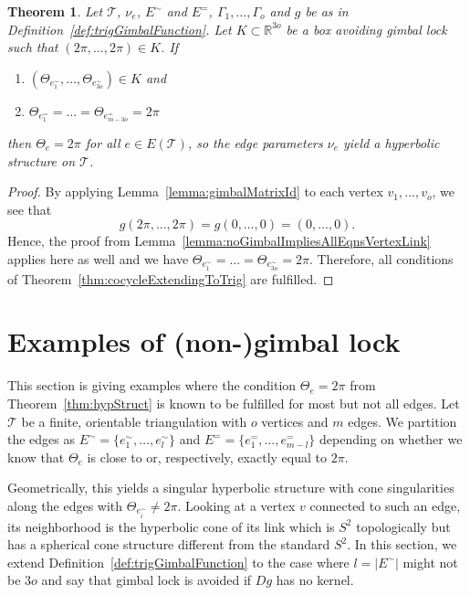 \documentclass[utopia,fullpage]{nmd/article}
\newcommand{\negSpace}{\!}
\newcommand\R{\mathbb R}
\newtheorem{theorem}{Theorem}[section]
\newcommand{\negSpace}{}
\newcommand\trig{\mathcal{T}}
\newcommand\myPath{\Gamma}
\begin{document}
\begin{theorem} \label{thm:mainThm}
Let $\trig\negSpace{}$, $\nu_e$, $E^\sim$ and $E^=$, $\myPath_1, \dots, \myPath_o$ and $g$ be as in Definition~\ref{def:trigGimbalFunction}. Let $K\subset \R^{3o}$ be a box avoiding gimbal lock such that $(2\pi, \dots, 2\pi)\in K$. If
\begin{enumerate}
\item $(\Theta_{e^\sim_1},\dots,\Theta_{e^\sim_{3o}})\in K$ and
\item $\Theta_{e^=_1}=\dots=\Theta_{e^=_{m-3o}}=2\pi$
\end{enumerate}
then $\Theta_e=2\pi$ for all $e\in E(\trig)$, so the edge parameters $\nu_e$ yield a hyperbolic structure on $\trig$\negSpace{}.
\end{theorem}

\begin{proof}
By applying Lemma~\ref{lemma:gimbalMatrixId} to each vertex $v_1,\dots, v_o$, we see that $$g(2\pi,\dots,2\pi)=g(0,\dots,0)=(0,\dots,0).$$ Hence, the proof from Lemma~\ref{lemma:noGimbalImpliesAllEqnsVertexLink} applies here as well and we have $\Theta_{e^\sim_1}=\dots=\Theta_{e^\sim_{3o}}=2\pi$. Therefore, all conditions of Theorem~\ref{thm:cocycleExtendingToTrig} are fulfilled.
\end{proof}

\section{Examples of (non-)gimbal lock} \label{section:examples}

This section is giving examples where the condition $\Theta_e=2\pi$ from Theorem~\ref{thm:hypStruct} is known to be fulfilled for most but not all edges.
Let $\trig$ be a finite, orientable triangulation with $o$ vertices and $m$ edges. We partition the edges as
  $E^\sim=\{e^\sim_1,\dots,e^\sim_l\}$ and $E^==\{e^=_1,\dots,e^=_{m-l}\}$ depending on whether we know that $\Theta_e$ is close to or, respectively, exactly equal to $2\pi$.

 Geometrically, this yields a singular hyperbolic structure with cone singularities along the edges with $\Theta_{e^\sim_i}\not=2\pi$. Looking at a vertex $v$ connected to such an edge, its neighborhood is the hyperbolic cone of its link which is $S^2$ topologically but has a spherical cone structure different from the standard $S^2$. In this section, we extend Definition~\ref{def:trigGimbalFunction} to the case where $l=|E^\sim|$ might not be $3o$ and say that gimbal lock is avoided if $Dg$ has no kernel.
\end{document}
